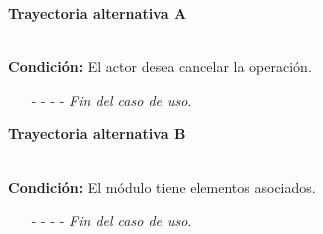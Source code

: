 \hypertarget{CU5-3:TAA}{\textbf{Trayectoria alternativa A}}\\
\noindent \textbf{Condición:} El actor desea cancelar la operación.
\begin{enumerate}
	\UCpaso[\UCactor] Solicita cancelar la operación oprimiendo el botón  del mensaje emergente .
	\UCpaso[\UCsist] Muestra la pantalla .
	\item[- -] - - {\em {Fin del caso de uso}}.%
\end{enumerate}

\hypertarget{CU5-3:TAB}{\textbf{Trayectoria alternativa B}}\\
\noindent \textbf{Condición:} El módulo tiene elementos asociados.
\begin{enumerate}
	\UCpaso[\UCsist] Muestra el mensaje  en la pantalla .
	\item[- -] - - {\em {Fin del caso de uso}}.%
\end{enumerate}
	

